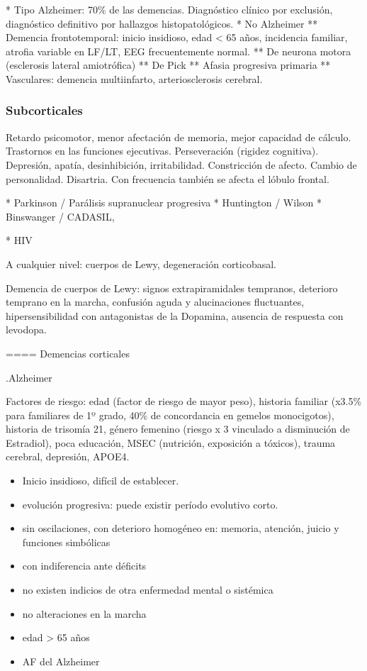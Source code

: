 * Tipo Alzheimer: 70\% de las demencias. Diagnóstico clínico por exclusión, diagnóstico definitivo por hallazgos histopatológicos.
* No Alzheimer
** Demencia frontotemporal: inicio insidioso, edad < 65 años, incidencia familiar, atrofia variable en LF/LT, EEG frecuentemente normal.
** De neurona motora (esclerosis lateral amiotrófica)
** De Pick
** Afasia progresiva primaria
** Vasculares: demencia multiinfarto, arteriosclerosis cerebral.

\subsubsection*{Subcorticales}
Retardo psicomotor, menor afectación de memoria, mejor capacidad de cálculo. Trastornos en las funciones ejecutivas. Perseveración (rigidez cognitiva). Depresión, apatía, desinhibición, irritabilidad. Constricción de afecto. Cambio de personalidad. Disartria. Con frecuencia también se afecta el lóbulo frontal.

* Parkinson / Parálisis supranuclear progresiva
* Huntington / Wilson
* Binswanger / CADASIL,

* HIV

A cualquier nivel: cuerpos de Lewy, degeneración corticobasal.

Demencia de cuerpos de Lewy: signos extrapiramidales tempranos, deterioro temprano en la marcha, confusión aguda y alucinaciones fluctuantes, hipersensibilidad con antagonistas de la Dopamina, ausencia de respuesta con levodopa.

==== Demencias corticales

.Alzheimer

Factores de riesgo: edad (factor de riesgo de mayor peso), historia familiar (x3.5\% para familiares de 1º grado, 40\% de concordancia en gemelos monocigotos), historia de trisomía 21, género femenino (riesgo x 3 vinculado a disminución de Estradiol), poca educación, MSEC (nutrición, exposición a tóxicos), trauma cerebral, depresión, APOE4.

\begin{itemize}
	\item Inicio insidioso, difícil de establecer.
	\item evolución progresiva: puede existir período evolutivo corto.
	\item sin oscilaciones, con deterioro homogéneo en: memoria, atención, juicio y funciones simbólicas
	\item con indiferencia ante déficits
	\item no existen indicios de otra enfermedad mental o sistémica
	\item no alteraciones en la marcha
	\item edad > 65 años
	\item AF del Alzheimer
\end{itemize}

